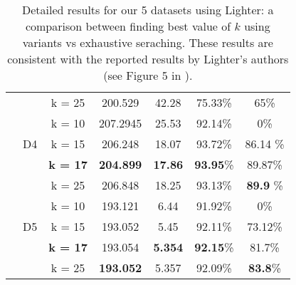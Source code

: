 \begin{table}
\begin{tabular}{ |c|c|c|c|c|c|c| }
     					  &  & k = 25 & 200.529 & 42.28 & 75.33\% & 65\%
 \\\cline{2-7}                         
                           &  & k = 10 & 207.2945 & 25.53 & 92.14\% & 0\%\\
                           & D4 & k = 15 & 206.248 & 18.07 & 93.72\% & 86.14 \%\\
                           &  & \textbf{k = 17} & \textbf{204.899} & \textbf{17.86} & \textbf{93.95}\% & 89.87\%\\
                             &  & k = 25 & 206.848 & 18.25 &  93.13\% & \textbf{89.9} \%
\\\cline{2-7}                            
                            &  & k = 10 & 193.121 & 6.44 & 91.92\% & 0\%\\
                            & D5 & k = 15 & 193.052 & 5.45 & 92.11\% & 73.12\% \\
                            &  & \textbf{k = 17} & 193.054  &  \textbf{5.354}  & \textbf{92.15}\% & 81.7\% \\
                 &  & k = 25 & \textbf{193.052} & 5.357 & 92.09\% & \textbf{83.8}\%\\                 
  \hline
  \end{tabular}
\caption {Detailed results for our 5 datasets using Lighter: a comparison between finding best value of $k$ using \name variants vs exhaustive seraching. These results are consistent with the reported results by Lighter's authors (see Figure 5 in \cite{song2014lighter}).}
\label{tb1:Lighter-Perplexity-vs-Alignment}
\end{table}


